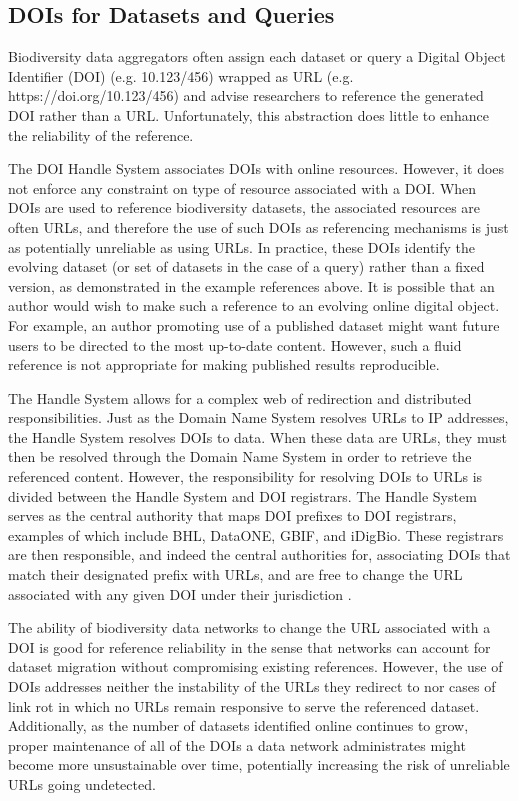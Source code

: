 \subsection*{DOIs for Datasets and Queries}

Biodiversity data aggregators often assign each dataset or query a Digital Object Identifier (DOI) \citep{Paskin_2009} (e.g. 10.123/456) wrapped as URL (e.g. https://doi.org/10.123/456) and advise researchers to reference the generated DOI rather than a URL. Unfortunately, this abstraction does little to enhance the reliability of the reference. 

The DOI Handle System \citep{Paskin_2009} associates DOIs with online resources. However, it does not enforce any constraint on type of resource associated with a DOI. When DOIs are used to reference biodiversity datasets, the associated resources are often URLs, and therefore the use of such DOIs as referencing mechanisms is just as potentially unreliable as using URLs. In practice, these DOIs identify the evolving dataset (or set of datasets in the case of a query) rather than a fixed version, as demonstrated in the example references above. It is possible that an author would wish to make such a reference to an evolving online digital object. For example, an author promoting use of a published dataset might want future users to be directed to the most up-to-date content. However, such a fluid reference is not appropriate for making published results reproducible. 

The Handle System allows for a complex web of redirection and distributed responsibilities. Just as the Domain Name System resolves URLs to IP addresses, the Handle System resolves DOIs to data. When these data are URLs, they must then be resolved through the Domain Name System in order to retrieve the referenced content. However, the responsibility for resolving DOIs to URLs is divided between the Handle System and DOI registrars. The Handle System serves as the central authority that maps DOI prefixes to DOI registrars, examples of which include BHL, DataONE, GBIF, and iDigBio. These registrars are then responsible, and indeed the central authorities for, associating DOIs that match their designated prefix with URLs, and are free to change the URL associated with any given DOI under their jurisdiction \citep{Paskin_2009,DOI_2018}.

The ability of biodiversity data networks to change the URL associated with a DOI is good for reference reliability in the sense that networks can account for dataset migration without compromising existing references. However, the use of DOIs addresses neither the instability of the URLs they redirect to nor cases of link rot in which no URLs remain responsive to serve the referenced dataset. Additionally, as the number of datasets identified online continues to grow, proper maintenance of all of the DOIs a data network administrates might become more unsustainable over time, potentially increasing the risk of unreliable URLs going undetected. 

